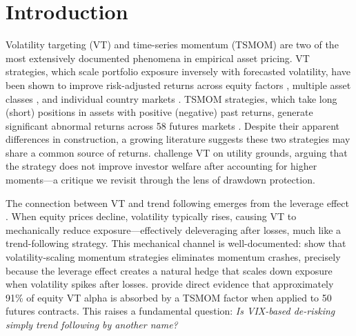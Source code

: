 \newpage

\section{Introduction}

Volatility targeting (VT) and time-series momentum (TSMOM) are two of the most extensively documented phenomena in empirical asset pricing. VT strategies, which scale portfolio exposure inversely with forecasted volatility, have been shown to improve risk-adjusted returns across equity factors \citep{moreira2017}, multiple asset classes \citep{harvey2018}, and individual country markets \citep{lai2026a}. TSMOM strategies, which take long (short) positions in assets with positive (negative) past returns, generate significant abnormal returns across 58 futures markets \citep{moskowitz2012}. Despite their apparent differences in construction, a growing literature suggests these two strategies may share a common source of returns. \citet{cederburg2020} challenge VT on utility grounds, arguing that the strategy does not improve investor welfare after accounting for higher moments---a critique we revisit through the lens of drawdown protection.

The connection between VT and trend following emerges from the leverage effect \citep{black1976, christie1982}. When equity prices decline, volatility typically rises, causing VT to mechanically reduce exposure---effectively deleveraging after losses, much like a trend-following strategy. This mechanical channel is well-documented: \citet{barroso2015} show that volatility-scaling momentum strategies eliminates momentum crashes, precisely because the leverage effect creates a natural hedge that scales down exposure when volatility spikes after losses. \citet{hood2025} provide direct evidence that approximately 91\% of equity VT alpha is absorbed by a TSMOM factor when applied to 50 futures contracts. This raises a fundamental question: \textit{Is VIX-based de-risking simply trend following by another name?}

